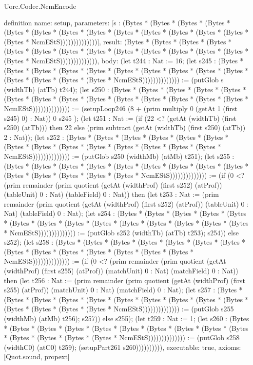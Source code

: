 \begin{lexlean}{Uorc.Codec.NcmEncode}
\begin{semanticmodule}
definition{
  name: setup,
  parameters: [s : (Bytes * (Bytes * (Bytes * (Bytes * (Bytes * (Bytes * (Bytes * (Bytes * (Bytes * (Bytes * (Bytes * (Bytes * (Bytes * (Bytes * NcmEStS))))))))))))))],
  result: (Bytes * (Bytes * (Bytes * (Bytes * (Bytes * (Bytes * (Bytes * (Bytes * (Bytes * (Bytes * (Bytes * (Bytes * (Bytes * (Bytes * NcmEStS)))))))))))))),
  body: (let t244 : Nat := 16; (let s245 : (Bytes * (Bytes * (Bytes * (Bytes * (Bytes * (Bytes * (Bytes * (Bytes * (Bytes * (Bytes * (Bytes * (Bytes * (Bytes * (Bytes * NcmEStS)))))))))))))) := (putGlob s (widthTb) (atTb) t244); (let s250 : (Bytes * (Bytes * (Bytes * (Bytes * (Bytes * (Bytes * (Bytes * (Bytes * (Bytes * (Bytes * (Bytes * (Bytes * (Bytes * (Bytes * NcmEStS)))))))))))))) := (setupLoop246 (8 + (prim multiply 0 (getAt 1 (first s245) 0) : Nat)) 0 s245 ); (let t251 : Nat := (if (22 <? (getAt (widthTb) (first s250) (atTb))) then 22 else (prim subtract (getAt (widthTb) (first s250) (atTb)) 2 : Nat)); (let s252 : (Bytes * (Bytes * (Bytes * (Bytes * (Bytes * (Bytes * (Bytes * (Bytes * (Bytes * (Bytes * (Bytes * (Bytes * (Bytes * (Bytes * NcmEStS)))))))))))))) := (putGlob s250 (widthMb) (atMb) t251); (let s255 : (Bytes * (Bytes * (Bytes * (Bytes * (Bytes * (Bytes * (Bytes * (Bytes * (Bytes * (Bytes * (Bytes * (Bytes * (Bytes * (Bytes * NcmEStS)))))))))))))) := (if (0 <? (prim remainder (prim quotient (getAt (widthProf) (first s252) (atProf)) (tableUnit) 0 : Nat) (tableField) 0 : Nat)) then (let t253 : Nat := (prim remainder (prim quotient (getAt (widthProf) (first s252) (atProf)) (tableUnit) 0 : Nat) (tableField) 0 : Nat); (let s254 : (Bytes * (Bytes * (Bytes * (Bytes * (Bytes * (Bytes * (Bytes * (Bytes * (Bytes * (Bytes * (Bytes * (Bytes * (Bytes * (Bytes * NcmEStS)))))))))))))) := (putGlob s252 (widthTb) (atTb) t253); s254)) else s252); (let s258 : (Bytes * (Bytes * (Bytes * (Bytes * (Bytes * (Bytes * (Bytes * (Bytes * (Bytes * (Bytes * (Bytes * (Bytes * (Bytes * (Bytes * NcmEStS)))))))))))))) := (if (0 <? (prim remainder (prim quotient (getAt (widthProf) (first s255) (atProf)) (matchUnit) 0 : Nat) (matchField) 0 : Nat)) then (let t256 : Nat := (prim remainder (prim quotient (getAt (widthProf) (first s255) (atProf)) (matchUnit) 0 : Nat) (matchField) 0 : Nat); (let s257 : (Bytes * (Bytes * (Bytes * (Bytes * (Bytes * (Bytes * (Bytes * (Bytes * (Bytes * (Bytes * (Bytes * (Bytes * (Bytes * (Bytes * NcmEStS)))))))))))))) := (putGlob s255 (widthMb) (atMb) t256); s257)) else s255); (let t259 : Nat := 1; (let s260 : (Bytes * (Bytes * (Bytes * (Bytes * (Bytes * (Bytes * (Bytes * (Bytes * (Bytes * (Bytes * (Bytes * (Bytes * (Bytes * (Bytes * NcmEStS)))))))))))))) := (putGlob s258 (widthC0) (atC0) t259); (setupPart261 s260)))))))))),
  executable: true,
  axioms: [Quot.sound, propext]
}


\end{semanticmodule}
\end{lexlean}
